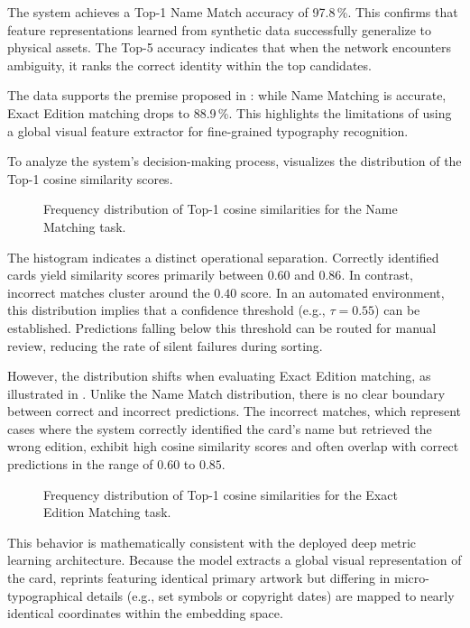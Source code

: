 The system achieves a Top-1 Name Match accuracy of 97.8\,\%. This confirms that feature representations learned from synthetic data successfully generalize to physical assets. The Top-5 accuracy indicates that when the network encounters ambiguity, it ranks the correct identity within the top candidates.

The data supports the premise proposed in : while Name Matching is accurate, Exact Edition matching drops to 88.9\,\%. This highlights the limitations of using a global visual feature extractor for fine-grained typography recognition.

To analyze the system's decision-making process,  visualizes the distribution of the Top-1 cosine similarity scores.

\begin{figure}[H]
    \centering
    
    \caption{Frequency distribution of Top-1 cosine similarities for the Name Matching task.}
    \label{fig:sim_histogram}
\end{figure}

The histogram indicates a distinct operational separation. Correctly identified cards yield similarity scores primarily between $0.60$ and $0.86$. In contrast, incorrect matches cluster around the $0.40$ score. In an automated environment, this distribution implies that a confidence threshold (e.g., $\tau = 0.55$) can be established. Predictions falling below this threshold can be routed for manual review, reducing the rate of silent failures during sorting.

However, the distribution shifts when evaluating Exact Edition matching, as illustrated in . Unlike the Name Match distribution, there is no clear boundary between correct and incorrect predictions. The incorrect matches, which represent cases where the system correctly identified the card's name but retrieved the wrong edition, exhibit high cosine similarity scores and often overlap with correct predictions in the range of $0.60$ to $0.85$.

\begin{figure}[H]
    \centering
    
    \caption{Frequency distribution of Top-1 cosine similarities for the Exact Edition Matching task.}
    \label{fig:sim_histogram_exact}
\end{figure}

This behavior is mathematically consistent with the deployed deep metric learning architecture. Because the model extracts a global visual representation of the card, reprints featuring identical primary artwork but differing in micro-typographical details (e.g., set symbols or copyright dates) are mapped to nearly identical coordinates within the embedding space. 

